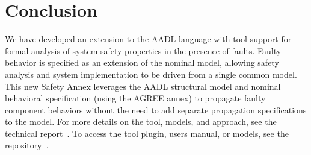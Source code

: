 \section{Conclusion}


We have developed an extension to the AADL language with tool support for formal analysis of system safety properties in the presence of faults. Faulty behavior is specified as an extension of the nominal model, allowing safety analysis and system implementation to be driven from a single common model. This new Safety Annex leverages the AADL structural model and nominal behavioral specification (using the AGREE annex) to propagate faulty component behaviors without the need to add separate propagation specifications to the model.  For more details on the tool, models, and approach, see the technical report~\cite{SATechReport}. To access the tool plugin, users manual, or models, see the repository~\cite{SAGithub}. 

